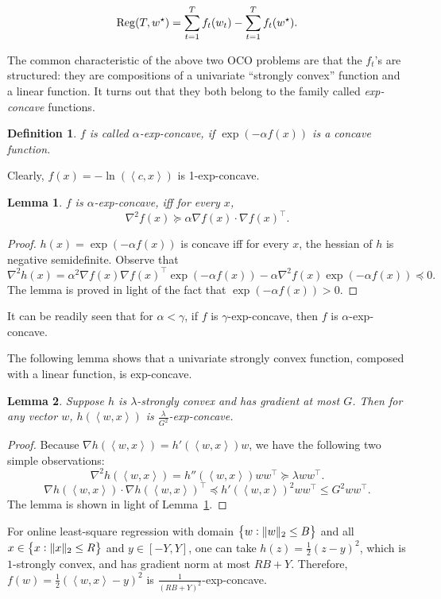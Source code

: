 \documentclass{article}
\newtheorem{lemma}{Lemma}
\newtheorem{definition}{Definition}
\DeclareMathOperator*{\Reg}{{\rm Reg}}
\newcommand{\inner}[2]{\left\langle #1,#2 \right\rangle}
\begin{document}
\[ \Reg(T, w^\star) = \sum_{t=1}^T f_t(w_t) - \sum_{t=1}^T f_t(w^\star). \]

The common characteristic of the above two OCO problems are that the $f_t$'s are structured:
they are compositions of a univariate ``strongly convex'' function and a linear function. It turns out that they both belong to the family called {\em exp-concave} functions.

\begin{definition}
$f$ is called $\alpha$-exp-concave, if $\exp(-\alpha f(x))$ is a concave function.
\end{definition}

Clearly, $f(x) = -\ln(\inner{c}{x})$ is 1-exp-concave.

\begin{lemma}
$f$ is $\alpha$-exp-concave, iff for every $x$,
\[ \nabla^2 f(x) \succeq \alpha \nabla f(x) \cdot \nabla f(x)^\top. \]
\label{lem:hes-grad}
\end{lemma}
\begin{proof}
$h(x) = \exp(-\alpha f(x))$ is concave iff for every $x$, the hessian of $h$ is negative
semidefinite.
Observe that
\[ \nabla^2 h(x) = \alpha^2 \nabla f(x) \nabla f(x)^\top \exp(-\alpha f(x)) - \alpha \nabla^2 f(x) \exp(-\alpha f(x)) \preceq 0. \]
The lemma is proved in light of the fact that $\exp(-\alpha f(x)) > 0$.
\end{proof}

It can be readily seen that for $\alpha < \gamma$, if $f$ is $\gamma$-exp-concave, then $f$ is $\alpha$-exp-concave.

The following lemma shows that a univariate strongly convex function, composed with a linear function, is exp-concave.
\begin{lemma}
Suppose $h$ is $\lambda$-strongly convex and has gradient at most $G$. Then for any vector $w$, $h(\inner{w}{x})$ is $\frac{\lambda}{G^2}$-exp-concave.
\end{lemma}
\begin{proof}
Because $\nabla h(\inner{w}{x}) = h'(\inner{w}{x}) w$,
we have the following two simple observations:
\[ \nabla^2 h(\inner{w}{x}) = h''(\inner{w}{x}) w w^\top \succeq \lambda w w^\top. \]
\[ \nabla h(\inner{w}{x}) \cdot \nabla h(\inner{w}{x})^\top \preceq h'(\inner{w}{x})^2 w w^\top \leq G^2 w w^\top. \]
The lemma is shown in light of Lemma~\ref{lem:hes-grad}.
\end{proof}

For online least-square regression with domain $\cbr{w: \| w\|_2 \leq B}$ and all $x \in \cbr{x: \| x \|_2 \leq R}$ and $y \in [-Y, Y]$,
one can take $h(z) = \frac12(z - y)^2$, which is $1$-strongly convex, and has gradient norm at most $RB+Y$. Therefore, $f(w) = \frac12(\inner{w}{x}-y)^2$ is $\frac{1}{(RB+Y)^2}$-exp-concave.
\end{document}
